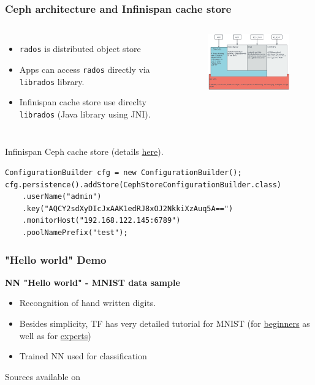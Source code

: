 \documentclass[10pt,utf8]{beamer}
\begin{document}
\begin{frame}[fragile]
	\frametitle{Ceph architecture and Infinispan cache store}
	\begin{columns}
	\begin{itemize}
		\item \texttt{rados} is distributed object store 
		\item Apps can access \texttt{rados} directly via \texttt{librados} library.
		\item Infinispan cache store use direclty \texttt{librados} (Java library using JNI).
	\end{itemize}
		\begin{figure}
			\centering
			\includegraphics[width=6cm]{./img/ceph_arch.eps}
		\end{figure}
	\end{columns}
	\vspace{0.5cm}
	Infinispan Ceph cache store (details \color{blue}\href{https://github.com/vjuranek/infinispan-cachestore-ceph}{here}\color{black}).
	\begin{lstlisting}[style=Java]
ConfigurationBuilder cfg = new ConfigurationBuilder();
cfg.persistence().addStore(CephStoreConfigurationBuilder.class)
    .userName("admin")
    .key("AQCY2sdXyDIcJxAAK1edRJ8xOJ2NkkiXzAuq5A==")
    .monitorHost("192.168.122.145:6789")
    .poolNamePrefix("test");
	\end{lstlisting}
\end{frame}


\begin{frame}
	\frametitle{"Hello world" Demo}
	\centering
	\textbf{NN "Hello world" - MNIST data sample} \\
	\vspace{1cm}
	\begin{itemize}
		\pause
		\item Recongnition of hand written digits.
		\pause
		\item Besides simplicity, TF has very detailed tutorial for MNIST (for \color{blue}\href{https://www.tensorflow.org/tutorials/mnist/beginners/}{beginners}\color{black} as well as for \href{https://www.tensorflow.org/tutorials/mnist/pros/}{experts}\color{black})
		\pause
		\item Trained NN used for classification
	\end{itemize}
	\vspace{1cm}
	Sources available on \textbf{}
\end{frame}
\end{document}
